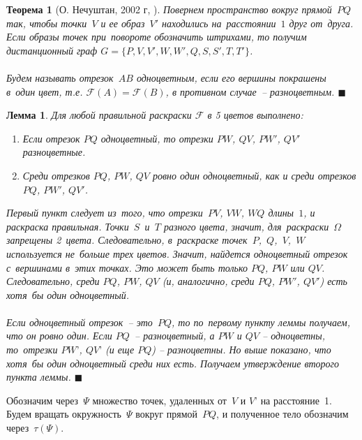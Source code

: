 \documentclass{report}%
\newtheorem{theorem}{Теорема}
\newtheorem{lemma}{Лемма}
\newenvironment{proof}{\par\noindent{\bf Доказательство.}}{\hfill$\scriptstyle\blacksquare$}
\begin{document}
\begin{theorem}[О. Нечуштан, 2002 г, \cite{Nechushtan2002}]
\begin{proof}
			  \noindent Повернем пространство вокруг прямой~$PQ$ так, чтобы точки~$V$ и ее образ~$V'$
				находились на~расстоянии~$1$ друг от~друга. Если образы точек при~повороте обозначить штрихами,
				то получим дистанционный граф $G = \{P, V, V', W, W' ,Q, S, S', T, T'\}$.\\\\
				\noindent Будем называть отрезок~$AB$ одноцветным, если его вершины покрашены в~один цвет,
				т.е. $\mathcal{F}(A) = \mathcal{F}(B)$, в противном случае~– разноцветным.
		\end{proof}
\end{theorem}
\newpage
\begin{lemma}
		Для любой правильной раскраски $\mathcal{F}$ в 5 цветов выполнено:
		\begin{enumerate}
				\item Если отрезок $PQ$ одноцветный, то отрезки $PW$, $QV$, $PW'$, $QV'$ разноцветные. 
				\item Среди отрезков $PQ$, $PW$, $QV$ ровно один одноцветный, как и среди отрезков $PQ$, $PW'$, $QV'$.
		\end{enumerate}
		\begin{proof}
				Первый пункт следует из~того, что отрезки~$PV$, $VW$, $WQ$ длины~$1$, и раскраска правильная.
				Точки~$S$~и~$T$ разного цвета, значит, для~раскраски~$\Omega$ запрещены 2~цвета.
				Следовательно, в~раскраске точек~$P$,~$Q$,~$V$,~$W$ используется не~больше трех цветов.
				Значит, найдется одноцветный отрезок с~вершинами в~этих точках. Это может быть только $PQ$, $PW$ или $QV$.
				Следовательно, среди $PQ$, $PW$, $QV$ (и, аналогично, среди $PQ$, $PW'$, $QV'$) есть хотя~бы один одноцветный.\\\\
				\noindent Если одноцветный отрезок~– это~$PQ$, то по~первому пункту леммы получаем, что он ровно один.
				Если $PQ$~– разноцветный, а $PW$ и $QV$ – одноцветны, то~отрезки $PW’$, $QV’$ (и еще $PQ$) – разноцветны.
				Но выше показано, что хотя~бы один одноцветный среди них есть. Получаем утверждение второго пункта леммы.
		\end{proof}
\end{lemma}

\noindent Обозначим через~$\Psi$ множество точек, удаленных от~$V$ и $V’$ на расстояние~1. Будем вращать окружность~$\Psi$ вокруг прямой~$PQ$, и полученное тело обозначим через~$\tau(\Psi)$.
\end{document}
